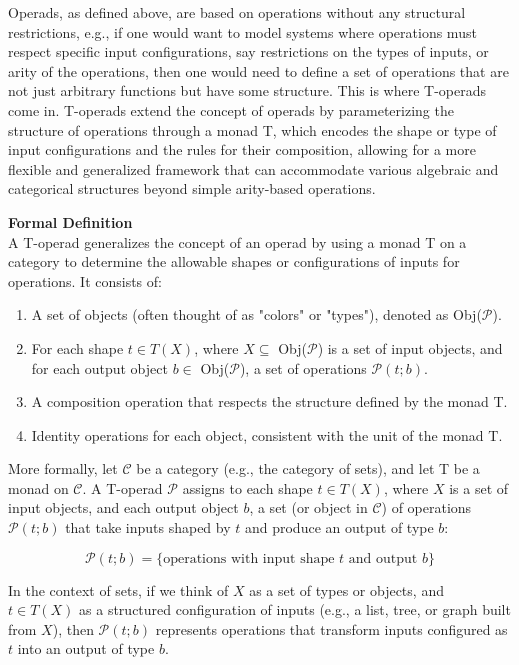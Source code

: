 Operads, as defined above, are based on operations without any structural restrictions, e.g., if one would want to model systems where operations must respect specific input configurations, say restrictions on the types of inputs, or arity of the operations, then one would need to define a set of operations that are not just arbitrary functions but have some structure. This is where T-operads come in. T-operads extend the concept of operads by parameterizing the structure of operations through a monad T, which encodes the shape or type of input configurations and the rules for their composition, allowing for a more flexible and generalized framework that can accommodate various algebraic and categorical structures beyond simple arity-based operations.

\textbf{Formal Definition}
\\

A T-operad generalizes the concept of an operad by using a monad T on a category to determine the allowable shapes or configurations of inputs for operations. It consists of:

\begin{enumerate}
  \item A set of objects (often thought of as "colors" or "types"), denoted as Obj($\mathcal{P}$).
  \item For each shape $t \in T(X)$, where $X \subseteq$ Obj($\mathcal{P}$) is a set of input objects, and for each output object $b \in$ Obj($\mathcal{P}$), a set of operations $\mathcal{P}(t; b)$.
  \item A composition operation that respects the structure defined by the monad T.
  \item Identity operations for each object, consistent with the unit of the monad T.
\end{enumerate}

More formally, let $\mathcal{C}$ be a category (e.g., the category of sets), and let T be a monad on $\mathcal{C}$. A T-operad $\mathcal{P}$ assigns to each shape $t \in T(X)$, where $X$ is a set of input objects, and each output object $b$, a set (or object in $\mathcal{C}$) of operations $\mathcal{P}(t; b)$ that take inputs shaped by $t$ and produce an output of type $b$:

\begin{equation}
  \mathcal{P}(t; b) = \{\text{operations with input shape } t \text{ and output } b\}
\end{equation}

In the context of sets, if we think of $X$ as a set of types or objects, and $t \in T(X)$ as a structured configuration of inputs (e.g., a list, tree, or graph built from $X$), then $\mathcal{P}(t; b)$ represents operations that transform inputs configured as $t$ into an output of type $b$.

